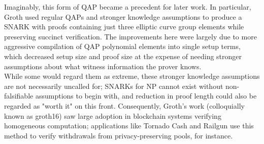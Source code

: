\noindent Imaginably, this form of QAP became a precedent for later work. In particular, Groth used regular QAPs and stronger knowledge assumptions to produce a SNARK with proofs containing just three elliptic curve group elements while preserving succinct verification. The improvements here were largely due to more aggressive compilation of QAP polynomial elements into single setup terms, which decreased setup size and proof size at the expense of needing stronger assumptions about what witness information the prover knows.\\

\noindent While some would regard them as extreme, these stronger knowledge assumptions are not necessarily uncalled for; SNARKs for NP cannot exist without non-falsifiable assumptions to begin with, and reduction in proof length could also be regarded as "worth it" on this front. Consequently, Groth's work (colloquially known as groth16) saw large adoption in blockchain systems verifying homogeneous computation; applications like Tornado Cash and Railgun use this method to verify withdrawals from privacy-preserving pools, for instance.
